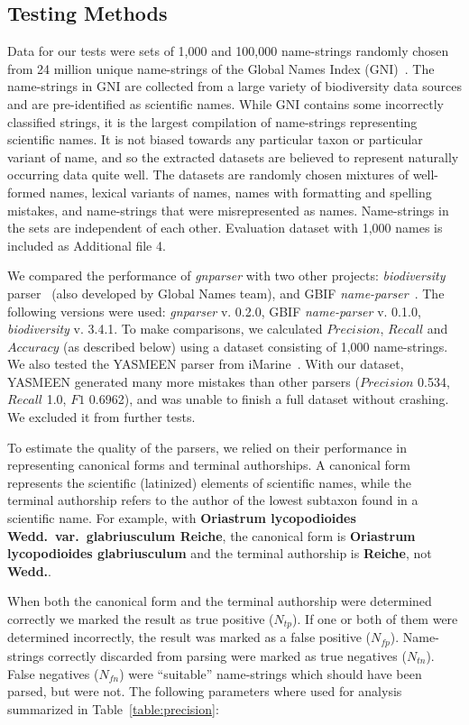 \documentclass{bmcart}
\begin{document}
\subsection*{Testing Methods}

Data for our tests were sets of 1,000 and 100,000 name-strings randomly chosen from 24 million unique name-strings of the Global Names Index (GNI)~\cite{gn:index}. The name-strings in GNI are collected from a large variety of biodiversity data sources and are pre-identified as scientific names. While GNI contains some incorrectly classified strings, it is the largest compilation of name-strings representing scientific names. It is not biased towards any particular taxon or particular variant of name, and so the extracted datasets are believed to represent naturally occurring data quite well. The datasets are randomly chosen mixtures of well-formed names, lexical variants of names, names with formatting and spelling mistakes, and name-strings that were misrepresented as names. Name-strings in the sets are independent of each other. Evaluation dataset with 1,000 names is included as Additional file 4.

We compared the performance of \textit{gnparser} with two other projects: \textit{biodiversity} parser~\cite{Boyle2013, biodiversity} (also developed by Global Names team), and GBIF \textit{name-parser}~\cite{gbifNameParser}. The following versions were used: \textit{gnparser} v.  0.2.0, GBIF \textit{name-parser} v. 0.1.0, \textit{biodiversity} v. 3.4.1. To make comparisons, we calculated $Precision$, $Recall$ and $Accuracy$ (as described below) using a dataset consisting of 1,000 name-strings. We also tested the YASMEEN parser from iMarine~\cite{VandenBerghe2015}. With our dataset, YASMEEN generated many more mistakes than other parsers ($Precision$ 0.534, $Recall$ 1.0, $F1$ 0.6962), and was unable to finish a full dataset without crashing. We excluded it from further tests.

To estimate the quality of the parsers, we relied on their performance in representing canonical forms and terminal authorships. A canonical form represents the scientific (latinized) elements of scientific names, while the terminal authorship refers to the author of the lowest subtaxon found in a scientific name. For example, with \textbf{Oriastrum lycopodioides Wedd.\ var.\ glabriusculum Reiche}, the canonical form is \textbf{Oriastrum lycopodioides glabriusculum} and the terminal authorship is \textbf{Reiche}, not \textbf{Wedd.}.

When both the canonical form and the terminal authorship were determined correctly we marked the result as true positive ($N_{tp}$). If one or both of them were determined incorrectly, the result was marked as a false positive ($N_{fp}$). Name-strings correctly discarded from parsing were marked as true negatives ($N_{tn}$). False negatives ($N_{fn}$) were ``suitable'' name-strings which should have been parsed, but were not. The following parameters where used for analysis summarized in Table~\ref{table:precision}:
\end{document}
